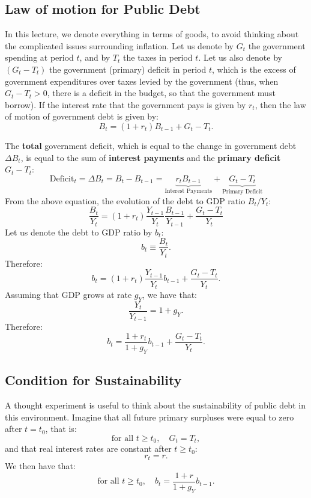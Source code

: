 \documentclass[]{book}
\begin{document}
\subsection{Law of motion for Public
Debt}\label{law-of-motion-for-public-debt}

In this lecture, we denote everything in terms of goods, to avoid
thinking about the complicated issues surrounding inflation. Let us
denote by \(G_t\) the government spending at period \(t\), and by
\(T_t\) the taxes in period \(t\). Let us also denote by \((G_t-T_t)\)
the government (primary) deficit in period \(t\), which is the excess of
government expenditures over taxes levied by the government (thus, when
\(G_t-T_t>0\), there is a deficit in the budget, so that the government
must borrow). If the interest rate that the government pays is given by
\(r_t\), then the law of motion of government debt is given by:
\[B_{t}=(1+r_t)B_{t-1}+G_{t}-T_{t}.\]

The \textbf{total} government deficit, which is equal to the change in
government debt \(\Delta B_{t}\), is equal to the sum of
\textbf{interest payments} and the \textbf{primary deficit}
\(G_{t}-T_{t}:\)
\[\text{Deficit}_{t}=\Delta B_{t}=B_{t}-B_{t-1}=\underbrace{r_tB_{t-1}}_{\text{Interest Payments}}+\underbrace{G_{t}-T_{t}}_{\text{Primary Deficit}}\]
From the above equation, the evolution of the debt to GDP ratio
\(B_{t}/Y_{t}\):
\[\frac{B_{t}}{Y_{t}}=(1+r_t)\frac{Y_{t-1}}{Y_{t}}\frac{B_{t-1}}{Y_{t-1}}+\frac{G_{t}-T_{t}}{Y_{t}}\]
Let us denote the debt to GDP ratio by \(b_t\):
\[b_t \equiv \frac{B_t}{Y_t}.\] Therefore:
\[b_t = (1+r_t)\frac{Y_{t-1}}{Y_{t}}b_{t-1}+\frac{G_{t}-T_{t}}{Y_{t}}.\]
Assuming that GDP grows at rate \(g_Y\), we have that:
\[\frac{Y_t}{Y_{t-1}}=1+g_Y.\] Therefore:
\[\boxed{b_t = \frac{1+r_t}{1+g_Y}b_{t-1}+\frac{G_{t}-T_{t}}{Y_{t}}}.\]

\subsection{Condition for
Sustainability}\label{condition-for-sustainability}

A thought experiment is useful to think about the sustainability of
public debt in this environment. Imagine that all future primary
surpluses were equal to zero after \(t=t_0\), that is:
\[\text{for all }t\geq t_{0},\quad G_{t}=T_{t},\] and that real interest
rates are constant after \(t \geq t_0\): \[r_t=r.\] We then have that:
\[\text{for all }t\geq t_{0},\quad b_t = \frac{1+r}{1+g_Y}b_{t-1}.\]
\end{document}
